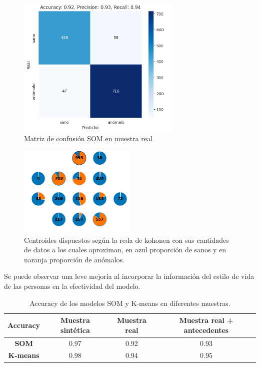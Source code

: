 \documentclass[titlepage,a4paper]{article}
\begin{document}
\begin{figure}[H] %
    \centering
    \includegraphics[width=0.7\textwidth]{test_som_real.png} %
    \caption{Matriz de confusión SOM en muestra real}
    \label{fig:mi_figura} %
\end{figure}
\begin{figure}[H] %
    \centering
    \includegraphics[width=0.5\textwidth]{visualizacion_som.png} %
    \caption{Centroides dispuestos según la reda de kohonen con sus cantidades de datos a los cuales aproximan, en azul proporción de sanos y en naranja proporción de anómalos.}
    \label{fig:mi_figura} %
\end{figure}
Se puede observar una leve mejoría al incorporar la información del estilo de vida de las personas en la efectividad del modelo.
\begin{table}[H]
    \centering
    \begin{tabular}{|c|c|c|c|}
        \hline
        \textbf{Accuracy} & \textbf{Muestra sintética} & \textbf{Muestra real} & \textbf{Muestra real + antecedentes} \\ \hline
        \textbf{SOM} & 0.97 & 0.92 & 0.93 \\ \hline
        \textbf{K-means} & 0.98 & 0.94 & 0.95 \\ \hline
    \end{tabular}
    \caption{Accuracy de los modelos SOM y K-means en diferentes muestras.}
    \label{tab:accuracy}
\end{table}
\end{document}
